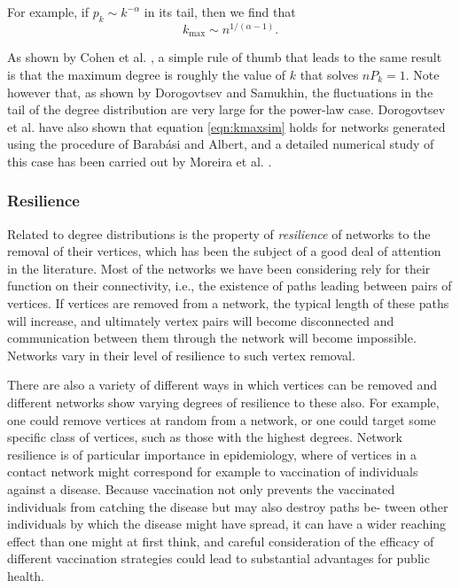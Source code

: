         For example, if $p_k \sim k^{−\alpha}$ in its tail, then we find that
        \begin{equation}
          k_{\mbox{max}} \sim n^{1/(\alpha-1)}\mbox{.} \label{eqn:kmaxsim}
        \end{equation}
        
        As shown by Cohen et al. \cite{CohenErezAvrahamHavlin2000}, a simple rule of thumb that leads to the same result is that the maximum degree is roughly the value of $k$ that solves $nP_k = 1$. Note however that, as shown by Dorogovtsev and Samukhin\cite{DorogovtsevSamukhin2002}, the fluctuations in the tail of the degree distribution are very large for the power-law case. Dorogovtsev et al. \cite{DorogovtsevMendesSamukhin2001} have also shown that equation \ref{eqn:kmaxsim} holds for networks generated using the  procedure of Barabási and Albert\cite{BarabasiAlbert1999}, and a detailed numerical study of this case has been carried out by Moreira et al. \cite{MoreiraAndradeAmaral2002}.
        
    \subsubsection{Resilience}
    
      Related to degree distributions is the property of \emph{resilience} of networks to the removal of their vertices, which has been the subject of a good deal of attention in the literature. Most of the networks we have been considering rely for their function on their connectivity, i.e., the existence of paths leading between pairs of vertices. If vertices are removed from a network, the typical length of these paths will increase, and ultimately vertex pairs will become disconnected and communication between them through the network will become impossible. Networks vary in their level of resilience to such vertex removal.
      
      There are also a variety of different ways in which vertices can be removed and different networks show varying degrees of resilience to these also. For example, one could remove vertices at random from a network, or one could target some specific class of vertices, such as those with the highest degrees. Network resilience is of particular importance in epidemiology, where  of vertices in a contact network might correspond for example to vaccination of individuals against a disease. Because vaccination not only prevents the vaccinated individuals from catching the disease but may also destroy paths be- tween other individuals by which the disease might have spread, it can have a wider reaching effect than one might at first think, and careful consideration of the efficacy of different vaccination strategies could lead to substantial advantages for public health.
      
